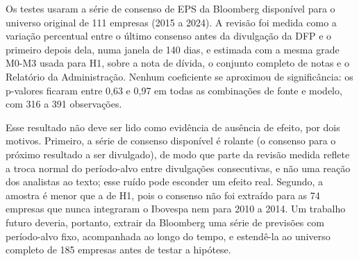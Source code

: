 \documentclass[a4paper,12pt]{report}
\begin{document}
Os testes usaram a série de consenso de EPS da Bloomberg disponível para o universo original de 111 empresas (2015 a 2024). A revisão foi medida como a variação percentual entre o último consenso antes da divulgação da DFP e o primeiro depois dela, numa janela de 140 dias, e estimada com a mesma grade M0-M3 usada para H1, sobre a nota de dívida, o conjunto completo de notas e o Relatório da Administração. Nenhum coeficiente se aproximou de significância: os p-valores ficaram entre 0,63 e 0,97 em todas as combinações de fonte e modelo, com 316 a 391 observações.

Esse resultado não deve ser lido como evidência de ausência de efeito, por dois motivos. Primeiro, a série de consenso disponível é rolante (o consenso para o próximo resultado a ser divulgado), de modo que parte da revisão medida reflete a troca normal do período-alvo entre divulgações consecutivas, e não uma reação dos analistas ao texto; esse ruído pode esconder um efeito real. Segundo, a amostra é menor que a de H1, pois o consenso não foi extraído para as 74 empresas que nunca integraram o Ibovespa nem para 2010 a 2014. Um trabalho futuro deveria, portanto, extrair da Bloomberg uma série de previsões com período-alvo fixo, acompanhada ao longo do tempo, e estendê-la ao universo completo de 185 empresas antes de testar a hipótese.



\end{document}

